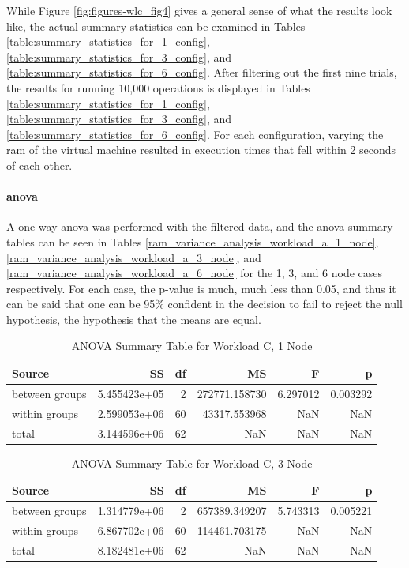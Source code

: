 While Figure \ref{fig:figures-wlc_fig4} gives a general sense of what the results look like, the actual summary statistics can be examined in Tables \ref{table:summary_statistics_for_1_config}, \ref{table:summary_statistics_for_3_config}, and \ref{table:summary_statistics_for_6_config}. After filtering out the first nine trials, the results for running 10,000 operations is displayed in Tables \ref{table:summary_statistics_for_1_config}, \ref{table:summary_statistics_for_3_config}, and \ref{table:summary_statistics_for_6_config}.  For each configuration, varying the \gls{ram} of the virtual machine resulted in execution times that fell within 2 seconds of each other.

\paragraph{\gls{anova}}

A one-way \gls{anova} was performed with the filtered data, and the \gls{anova} summary tables can be seen in Tables \ref{ram_variance_analysis_workload_a_1_node}, \ref{ram_variance_analysis_workload_a_3_node}, and \ref{ram_variance_analysis_workload_a_6_node} for the 1, 3, and 6 node cases respectively.  For each case, the  p-value is much, much less than 0.05, and thus it can be said that one can be 95\% confident in the decision to fail to reject the null hypothesis, the hypothesis that the means are equal.

\begin{table}
\begin{tabular}{lrrrrr}
\toprule
         Source &            SS &  df &             MS &         F &         p \\
\midrule
 between groups &  5.455423e+05 &   2 &  272771.158730 &  6.297012 &  0.003292 \\
  within groups &  2.599053e+06 &  60 &   43317.553968 &       NaN &       NaN \\
          total &  3.144596e+06 &  62 &            NaN &       NaN &       NaN \\
\bottomrule
\end{tabular}
\caption{ANOVA Summary Table for Workload C, 1 Node}
\label{table:ram_variance_analysis_workload_c_1_node}
\end{table}

\begin{table}
\begin{tabular}{lrrrrr}
\toprule
         Source &            SS &  df &             MS &         F &         p \\
\midrule
 between groups &  1.314779e+06 &   2 &  657389.349207 &  5.743313 &  0.005221 \\
  within groups &  6.867702e+06 &  60 &  114461.703175 &       NaN &       NaN \\
          total &  8.182481e+06 &  62 &            NaN &       NaN &       NaN \\
\bottomrule
\end{tabular}
\caption{ANOVA Summary Table for Workload C, 3 Node}
\label{table:ram_variance_analysis_workload_c_3_node}
\end{table}

